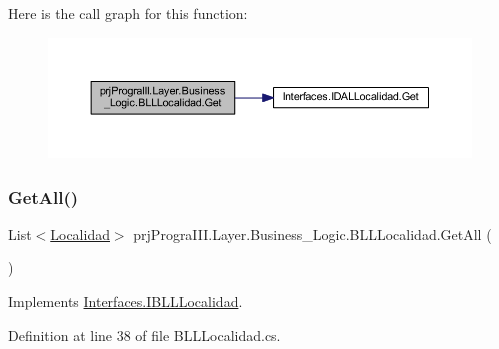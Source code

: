 Here is the call graph for this function\+:
\nopagebreak
\begin{figure}[H]
\begin{center}
\leavevmode
\includegraphics[width=350pt]{classprj_progra_i_i_i_1_1_layer_1_1_business___logic_1_1_b_l_l_localidad_a812546114fa49a4ca4ea9295d0d9e62b_cgraph}
\end{center}
\end{figure}
\hypertarget{classprj_progra_i_i_i_1_1_layer_1_1_business___logic_1_1_b_l_l_localidad_a0d66ff6caddf671534b300fb5ce2c3df}{}\label{classprj_progra_i_i_i_1_1_layer_1_1_business___logic_1_1_b_l_l_localidad_a0d66ff6caddf671534b300fb5ce2c3df} 
\subsubsection{\texorpdfstring{Get\+All()}{GetAll()}}
{\footnotesize\ttfamily List$<$\hyperlink{classprj_progra_i_i_i_1_1_layer_1_1_entities_1_1_localidad}{Localidad}$>$ prj\+Progra\+I\+I\+I.\+Layer.\+Business\+\_\+\+Logic.\+B\+L\+L\+Localidad.\+Get\+All (\begin{DoxyParamCaption}{ }\end{DoxyParamCaption})}



Implements \hyperlink{interface_interfaces_1_1_i_b_l_l_localidad_afc2e7478f3ffcee4730c47a9cfb0cfca}{Interfaces.\+I\+B\+L\+L\+Localidad}.



Definition at line 38 of file B\+L\+L\+Localidad.\+cs.

